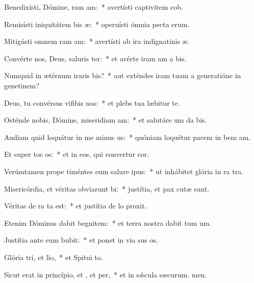\item Benedixísti, Dómine, ram am:~* avertísti captivitem cob.
\item Remisísti iniquitátem bis æ:~* operuísti ómnia pecta erum.
\item Mitigásti omnem ram am:~* avertísti ab ira indignatinis æ.
\item Convérte nos, Deus, saluris ter:~* et avérte iram am a bis.
\item Numquid in ætérnum iraris bis?~* aut exténdes iram tuam a generatióne in genetinem?
\item Deus, tu convérsus vifibis nos:~* et plebs tua læbitur  te.
\item Osténde nobis, Dómine, miseridiam am:~* et salutáre um da bis.
\item Audiam quid loquátur in me minus us:~* quóniam loquétur pacem in bem am.
\item Et super tos os:~* et in eos, qui convertur  cor.
\item Verúmtamen prope timéntes eum salure ipus:~* ut inhábitet glória in ra tra.
\item Misericórdia, et véritas obviarunt bi:~* justítia, et pax cutæ sunt.
\item Véritas de ra ta est:~* et justítia de lo proxit.
\item Etenim Dóminus dabit begnitem:~* et terra nostra dabit tum um.
\item Justítia ante eum bubit:~* et ponet in via sus os.
\item Glória tri, et lio,~* et Spitui to.
\item Sicut erat in princípio, et , et per,~* et in sǽcula sæcurum. men.
